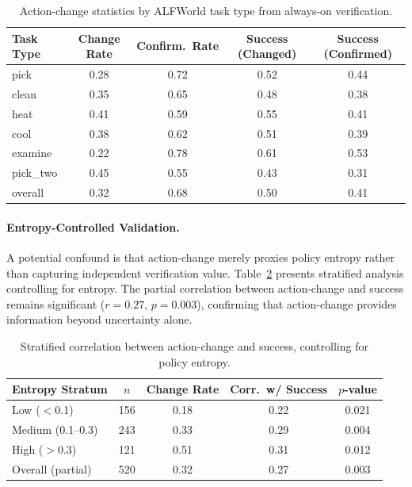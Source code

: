 \documentclass[11pt]{article}
\begin{document}
\begin{table}[h]
\centering
\caption{Action-change statistics by ALFWorld task type from always-on verification.}
\label{tab:action_change}
\begin{tabular}{lcccc}
\toprule
Task Type & Change Rate & Confirm.\ Rate & Success (Changed) & Success (Confirmed) \\
\midrule
pick & 0.28 & 0.72 & 0.52 & 0.44 \\
clean & 0.35 & 0.65 & 0.48 & 0.38 \\
heat & 0.41 & 0.59 & 0.55 & 0.41 \\
cool & 0.38 & 0.62 & 0.51 & 0.39 \\
examine & 0.22 & 0.78 & 0.61 & 0.53 \\
pick\_two & 0.45 & 0.55 & 0.43 & 0.31 \\
\midrule
overall & 0.32 & 0.68 & 0.50 & 0.41 \\
\bottomrule
\end{tabular}
\end{table}

\paragraph{Entropy-Controlled Validation.}
A potential confound is that action-change merely proxies policy entropy rather than capturing independent verification value. Table~\ref{tab:entropy} presents stratified analysis controlling for entropy. The partial correlation between action-change and success remains significant ($r = 0.27$, $p = 0.003$), confirming that action-change provides information beyond uncertainty alone.

\begin{table}[h]
\centering
\caption{Stratified correlation between action-change and success, controlling for policy entropy.}
\label{tab:entropy}
\begin{tabular}{lcccc}
\toprule
Entropy Stratum & $n$ & Change Rate & Corr.\ w/ Success & $p$-value \\
\midrule
Low ($<$0.1) & 156 & 0.18 & 0.22 & 0.021 \\
Medium (0.1--0.3) & 243 & 0.33 & 0.29 & 0.004 \\
High ($>$0.3) & 121 & 0.51 & 0.31 & 0.012 \\
\midrule
Overall (partial) & 520 & 0.32 & 0.27 & 0.003 \\
\bottomrule
\end{tabular}
\end{table}
\end{document}
